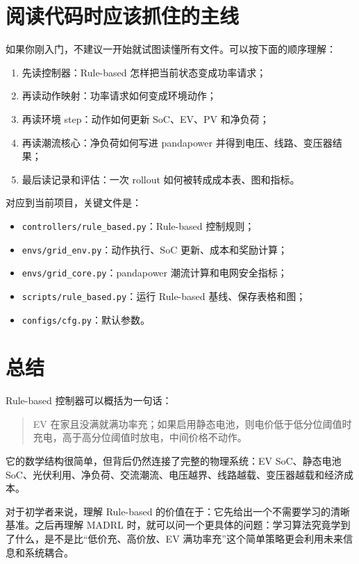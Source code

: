 \documentclass[UTF8,zihao=-4]{ctexart}
\begin{document}
\section{阅读代码时应该抓住的主线}

如果你刚入门，不建议一开始就试图读懂所有文件。可以按下面的顺序理解：

\begin{enumerate}
  \item 先读控制器：Rule-based 怎样把当前状态变成功率请求；
  \item 再读动作映射：功率请求如何变成环境动作；
  \item 再读环境 step：动作如何更新 SoC、EV、PV 和净负荷；
  \item 再读潮流核心：净负荷如何写进 pandapower 并得到电压、线路、变压器结果；
  \item 最后读记录和评估：一次 rollout 如何被转成成本表、图和指标。
\end{enumerate}

对应到当前项目，关键文件是：
\begin{itemize}
  \item \texttt{controllers/rule\_based.py}：Rule-based 控制规则；
  \item \texttt{envs/grid\_env.py}：动作执行、SoC 更新、成本和奖励计算；
  \item \texttt{envs/grid\_core.py}：pandapower 潮流计算和电网安全指标；
  \item \texttt{scripts/rule\_based.py}：运行 Rule-based 基线、保存表格和图；
  \item \texttt{configs/cfg.py}：默认参数。
\end{itemize}

\section{总结}

Rule-based 控制器可以概括为一句话：

\begin{quote}
EV 在家且没满就满功率充；如果启用静态电池，则电价低于低分位阈值时充电，高于高分位阈值时放电，中间价格不动作。
\end{quote}

它的数学结构很简单，但背后仍然连接了完整的物理系统：EV SoC、静态电池 SoC、光伏利用、净负荷、交流潮流、电压越界、线路越载、变压器越载和经济成本。

对于初学者来说，理解 Rule-based 的价值在于：它先给出一个不需要学习的清晰基准。之后再理解 MADRL 时，就可以问一个更具体的问题：学习算法究竟学到了什么，是不是比“低价充、高价放、EV 满功率充”这个简单策略更会利用未来信息和系统耦合。
\end{document}
